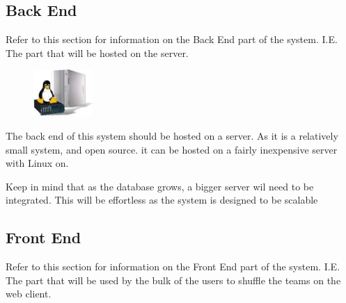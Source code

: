 \subsection{Back End}
	Refer to this section for information on the Back End part of the system. I.E. The part that will be hosted on the server.\par
	\vspace{0.3cm}
	
\begin{figure}
    \includegraphics[width=0.2\textwidth]{./graphics/LinuxServer.jpg}
\end{figure}

The back end of this system should be hosted on a server.
As it is a relatively small system, and open source. it can be hosted on a fairly inexpensive server with Linux on.

Keep in mind that as the database grows, a bigger server wil need to be integrated.  This will be effortless as the system is designed to be scalable

\subsection{Front End}
	Refer to this section for information on the Front End part of the system. I.E. The part that will be 	used by the bulk of the users to shuffle the teams on the web client.\par
